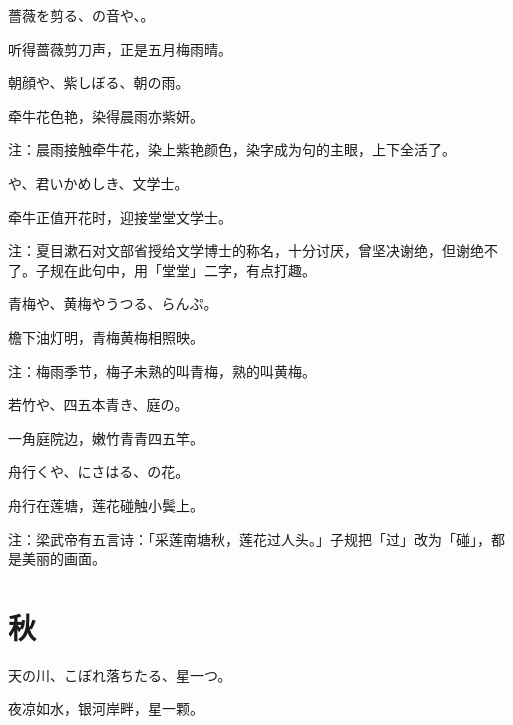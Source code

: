 \begin{haiku}
    {\FH 薔薇を剪る、の音や、。}

    {\FK 听得蔷薇剪刀声，正是五月梅雨晴。}
\end{haiku}

\begin{haiku}
    {\FH 朝顔や、紫しぼる、朝の雨。}

    {\FK 牵牛花色艳，染得晨雨亦紫妍。}

    {\FT 注：晨雨接触牵牛花，染上紫艳颜色，染字成为句的主眼，上下全活了。}
\end{haiku}

\begin{haiku}
    {\FH {}や、君いかめしき、文学士。}

    {\FK 牵牛正值开花时，迎接堂堂文学士。}

    {\FT 注：夏目漱石对文部省授给文学博士的称名，十分讨厌，曾坚决谢绝，但谢绝不了。子规在此句中，用「堂堂」二字，有点打趣。}
\end{haiku}

\begin{haiku}
    {\FH 青梅や、黄梅やうつる、らんぷ。}

    {\FK 檐下油灯明，青梅黄梅相照映。}

    {\FT 注：梅雨季节，梅子未熟的叫青梅，熟的叫黄梅。}
\end{haiku}

\begin{haiku}
    {\FH 若竹や、四五本青き、庭の。}

    {\FK 一角庭院边，嫩竹青青四五竿。}
\end{haiku}

\begin{haiku}
    {\FH 舟行くや、にさはる、の花。}

    {\FK 舟行在莲塘，莲花碰触小鬓上。}

    {\FT 注：梁武帝有五言诗：「采莲南塘秋，莲花过人头。」子规把「过」改为「碰」，都是美丽的画面。}
\end{haiku}

\section{\FK 秋}

\setcounter{haikucounter}{0}

\begin{haiku}
    {\FH 天の川、こぼれ落ちたる、星一つ。}

    {\FK 夜凉如水，银河岸畔，星一颗。}
\end{haiku}

